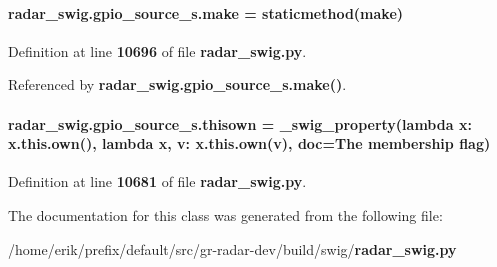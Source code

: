 \paragraph[{make}]{\setlength{\rightskip}{0pt plus 5cm}radar\+\_\+swig.\+gpio\+\_\+source\+\_\+s.\+make = staticmethod(make)\hspace{0.3cm}{\ttfamily [static]}}\label{classradar__swig_1_1gpio__source__s_a95dcbd5b80bd9b2981ab0a3e817e2705}


Definition at line {\bf 10696} of file {\bf radar\+\_\+swig.\+py}.



Referenced by {\bf radar\+\_\+swig.\+gpio\+\_\+source\+\_\+s.\+make()}.

\paragraph[{thisown}]{\setlength{\rightskip}{0pt plus 5cm}radar\+\_\+swig.\+gpio\+\_\+source\+\_\+s.\+thisown = {\bf \+\_\+swig\+\_\+property}(lambda x\+: x.\+this.\+own(), lambda {\bf x}, v\+: x.\+this.\+own(v), doc=\textquotesingle{}The membership flag\textquotesingle{})\hspace{0.3cm}{\ttfamily [static]}}\label{classradar__swig_1_1gpio__source__s_ac58c5f08902f8c9c7db492de38da0fcf}


Definition at line {\bf 10681} of file {\bf radar\+\_\+swig.\+py}.



The documentation for this class was generated from the following file\+:\begin{DoxyCompactItemize}
\item 
/home/erik/prefix/default/src/gr-\/radar-\/dev/build/swig/{\bf radar\+\_\+swig.\+py}\end{DoxyCompactItemize}
